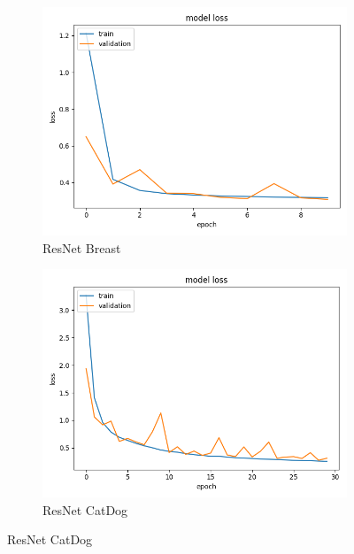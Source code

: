\begin{figure}[h]
\begin{subfigure}[b]{.45\linewidth}
\includegraphics[width=\linewidth]{Figs/resnet_breast_loss.jpg}
\caption{ResNet Breast}
\end{subfigure}
\begin{subfigure}[b]{.45\linewidth}
\includegraphics[width=\linewidth]{Figs/resnet_catdog_loss.jpg}
\caption{ResNet CatDog}
\end{subfigure}


\end{figure}
